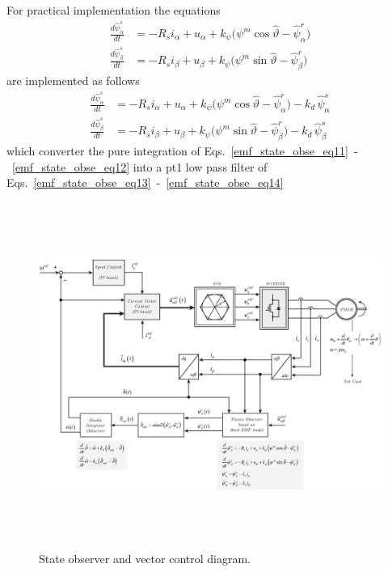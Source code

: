 \documentclass[11pt,a4paper,oneside]{book}
\numberwithin{equation}{section}
\theoremstyle{it}
\theoremstyle{definition}
\begin{document}
For practical implementation the equations
\begin{align}
	\frac{d\hat{\psi}_{\alpha}^s}{dt} &= -R_s i_{\alpha} + u_{\alpha} + k_\psi \Big(\psi^m\cos\hat{\vartheta}-\hat{\psi}_{\alpha}^r\Big) \label{emf_state_obse_eq11} \\[6pt]
	\frac{d\hat{\psi}_{\beta}^s}{dt} &= -R_s i_{\beta} + u_{\beta} + k_\psi \Big(\psi^m\sin\hat{\vartheta}-\hat{\psi}_{\beta}^r\Big) \label{emf_state_obse_eq12}
\end{align}
are implemented as follows
\begin{align}
	\frac{d\hat{\psi}_{\alpha}^s}{dt} &= -R_s i_{\alpha} + u_{\alpha} + k_\psi \Big(\psi^m\cos\hat{\vartheta}-\hat{\psi}_{\alpha}^r\Big) - k_{d}\,\hat{\psi}_{\alpha}^s \label{emf_state_obse_eq13} \\[6pt]
	\frac{d\hat{\psi}_{\beta}^s}{dt} &= -R_s i_{\beta} + u_{\beta} + k_\psi \Big(\psi^m\sin\hat{\vartheta}-\hat{\psi}_{\beta}^r\Big) - k_{d}\,\hat{\psi}_{\beta}^s \label{emf_state_obse_eq14}
\end{align}
which converter the pure integration of Eqs.~\eqref{emf_state_obse_eq11}~-~\eqref{emf_state_obse_eq12} into a pt1 low pass filter of Eqs.~\eqref{emf_state_obse_eq13}~-~\eqref{emf_state_obse_eq14}
\begin{figure}[H]
	\centering
	\includegraphics[height= 320pt, angle = 0, 
	keepaspectratio]{figures/control_layout/pmsm_sv_ctrl_scheme_1.eps}
	\captionsetup{width=0.5\textwidth, font=small}	
	\caption{State observer and vector control diagram.}
	\label{pmsm_sv_ctrl_scheme_1}
\end{figure}
\end{document}
